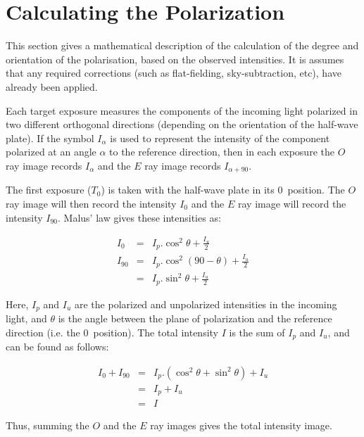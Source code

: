 \section{\label{APP:POL}Calculating the Polarization}
This section gives a mathematical description of the calculation of the
degree and orientation of the polarisation, based on the observed
intensities. It is assumes that any required corrections (such as
flat-fielding, sky-subtraction, etc), have already been applied.

Each target exposure measures the components of the incoming light
polarized in two different orthogonal directions (depending on the
orientation of the half-wave plate). If the symbol $I_{\alpha}$ is used
to represent the intensity of the component polarized at an angle
$\alpha$ to the reference direction, then in each exposure the $O$ ray
image records $I_{\alpha}$ and the $E$ ray image records $I_{\alpha+90}$.

The first exposure ($T_{0}$) is taken with the half-wave plate in its 0\dgs\
position. The $O$ ray image will then record the intensity $I_{0}$ and
the $E$ ray image will record the intensity $I_{90}$. Malus' law gives
these intensities as:

\begin{myquote}
\begin{eqnarray*}
  I_{0} & = & I_{p}.\cos^{2}\theta + \frac{I_{u}}{2} \\
 I_{90} & = & I_{p}.\cos^{2}(90 - \theta) + \frac{I_{u}}{2} \\
        & = & I_{p}.\sin^{2}\theta + \frac{I_{u}}{2}
\end{eqnarray*}
\end{myquote}

Here, $I_{p}$ and $I_{u}$ are the polarized and unpolarized intensities
in the incoming light, and $\theta$ is the angle between the plane of
polarization and the reference direction (i.e. the 0\dgs\ position). The
total intensity $I$ is the sum of $I_{p}$ and $I_{u}$, and can be found
as follows:
\begin{myquote}
\begin{eqnarray*}
  I_{0} + I_{90} & = & I_{p}.(\cos^{2}\theta + \sin^{2}\theta) + I_{u} \\
                 & = & I_{p} + I_{u} \\
                 & = & I
\end{eqnarray*}
\end{myquote}

Thus, summing the $O$ and the $E$ ray images gives the total intensity
image. 

